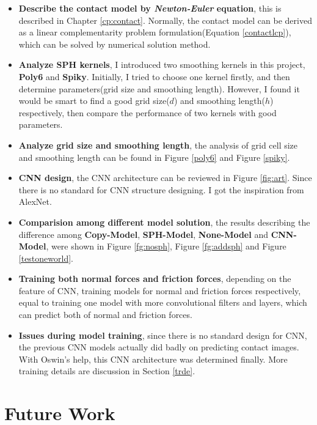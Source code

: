 \begin{itemize}
    \item \textbf{Describe the contact model by \textit{Newton-Euler} equation}, this is described in Chapter \ref{cp:contact}. Normally, the contact model can be derived as a linear complementarity problem formulation(Equation \ref{contactlcp}), which can be solved by numerical solution method.
    \item \textbf{Analyze SPH kernels}, I introduced two smoothing kernels in this project, \textbf{Poly6} and \textbf{Spiky}. Initially, I tried to choose one kernel firstly, and then determine parameters(grid size and smoothing length). However, I found it would be smart to find a good grid size($d$) and smoothing length($h$) respectively, then compare the performance of two kernels with good parameters.  
    \item \textbf{Analyze grid size and smoothing length}, the analysis of grid cell size and smoothing length can be found in Figure \ref{poly6} and Figure \ref{spiky}.
    \item \textbf{CNN design}, the CNN architecture can be reviewed in Figure \ref{fig:art}. Since there is no standard for CNN structure designing. I got the inspiration from AlexNet.
    \item \textbf{Comparision among different model solution}, the results describing the difference among \textbf{Copy-Model}, \textbf{SPH-Model}, \textbf{None-Model} and \textbf{CNN-Model}, were shown in Figure \ref{fg:nosph}, Figure \ref{fg:addsph} and Figure \ref{testoneworld}.
    \item \textbf{Training both normal forces and friction forces}, depending on the feature of CNN, training models for normal and friction forces respectively, equal to training one model with more convolutional filters and layers, which can predict both of normal and friction forces.
    \item \textbf{Issues during model training}, since there is no standard design for CNN, the previous CNN models actually did badly on predicting contact images. With Oswin's help, this CNN architecture was determined finally. More training details are discussion in Section \ref{trde}. 
\end{itemize}

\section{Future Work}
